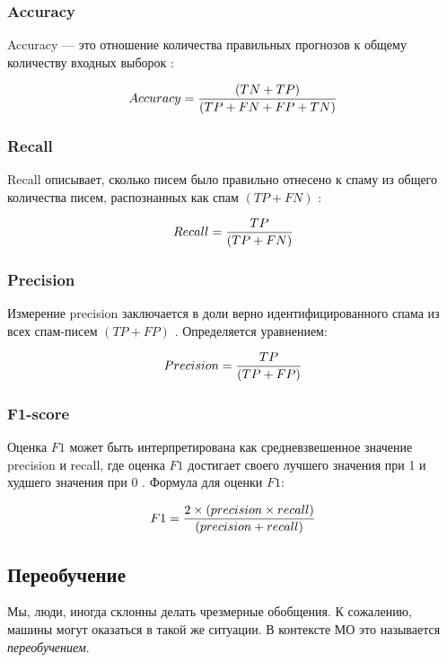 \subsubsection{Accuracy}

Accuracy — это отношение количества правильных прогнозов к общему количеству входных
выборок \cite{scikitMetrics}:

\begin{equation}\label{eq11}
    Accuracy = {{(TN + TP)} \over{(TP + FN + FP + TN)}}
\end{equation}

\subsubsection{Recall}

Recall описывает, сколько писем было правильно отнесено к спаму из
общего количества писем, распознанных как спам $(TP + FN)$ \cite{scikitMetrics}:

\begin{equation}\label{eq12}
    Recall = {{TP} \over{(TP + FN)}}
\end{equation}

\subsubsection{Precision}

Измерение precision заключается в доли верно идентифицированного
спама из всех спам-писем $(TP + FP)$ \cite{scikitMetrics}. Определяется
уравнением:

\begin{equation}\label{eq13}
    Precision = {{TP} \over{(TP + FP)}}
\end{equation}

\subsubsection{F1-score}

Оценка $F1$ может быть интерпретирована как средневзвешенное
значение precision и recall, где оценка $F1$ достигает своего лучшего
значения при 1 и худшего значения при 0 \cite{scikitMetrics}.
Формула для оценки $F1$:

\begin{equation}\label{eq14}
    F1 = {2 \times (precision \times recall) \over{(precision + recall)}}
\end{equation}

\subsection{Переобучение}
Мы, люди, иногда склонны делать чрезмерные обобщения. К сожалению,
машины могут оказаться в такой же ситуации. В контексте МО это называется
\emph{переобучением}.

